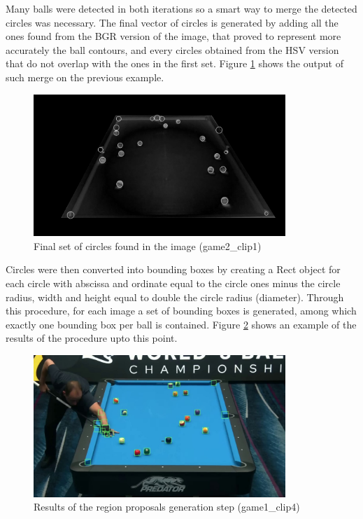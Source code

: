 Many balls were detected in both iterations so a smart way to merge the detected circles was necessary.
The final vector of circles is generated by adding all the ones found from the BGR version of the image, that proved 
to represent more accurately the ball contours, and every circles obtained from the HSV version that do not overlap with the ones
in the first set. Figure \ref{fig:circles_final} shows the output of such merge on the previous example. \\
\begin{figure}[h!]
    \centering
    \includegraphics[width=0.85\textwidth]{imgs/ball_localization/circles_merged.jpg}
    \caption{Final set of circles found in the image (game2\_clip1)}
    \label{fig:circles_final}
\end{figure}

Circles were then converted into bounding boxes by creating a Rect object for each circle with abscissa and ordinate equal to the circle ones minus the circle radius,
width and height equal to double the circle radius (diameter).
Through this procedure, for each image a set of bounding boxes is generated, among which exactly one bounding box per ball is contained. 
Figure \ref{fig:fp_detection} shows an example of the results of the procedure upto this point.\\
\begin{figure}[h!]
    \centering
    \includegraphics[width=0.85\textwidth]{imgs/ball_localization/fp_detection.jpg}
    \caption{Results of the region proposals generation step (game1\_clip4)}
    \label{fig:fp_detection}
\end{figure}


